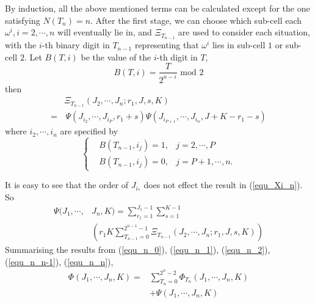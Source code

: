 \documentclass[journal]{IEEEtran}
\begin{document}
By induction, all the above mentioned terms can be calculated except for the one satisfying $N(T_n) = n$. %
After the first stage, we can choose which sub-cell each $\omega^i, i = 2, \cdots, n$ will eventually lie in, and $\Xi_{T_{n-1}}$ are used to consider each situation, with the $i$-th binary digit in $T_{n-1}$ representing that $\omega^i$ lies in sub-cell $1$ or sub-cell $2$. %
Let $B(T, i)$ be the value of the $i$-th digit in $T$,  
\begin{equation}
B(T, i) = \frac{T}{2^{n-i}}\mbox{ mod } 2
\end{equation}
then
\begin{equation}\label{equ_Xi_n}
\begin{aligned}
&\Xi_{T_{n-1}}(J_2, \cdots, J_n; r_1, J, s, K) \\
=&\, \Psi(J_{i_2}, \cdots, J_{i_P}, r_1+s)\Psi(J_{i_{P+1}}, \cdots, J_{i_n}, J+K-r_1-s)
\end{aligned}
\end{equation}
where $i_2, \cdots, i_n$ are specified by
\begin{equation}
\left\{
\begin{aligned}
&B(T_{n-1}, i_j) = 1, &j = 2, \cdots, P\\
&B(T_{n-1}, i_j) = 0, &j = P+1, \cdots, n.
\end{aligned}
\right.
\end{equation}

It is easy to see that the order of $J_{i_*}$ does not effect the result in (\ref{equ_Xi_n}). So
\begin{equation}\label{equ_n_n}
\begin{aligned}
\Psi(J_1, \cdots, &J_n, K) = \sum\limits_{r_1 = 1}^{J_1 - 1} \sum\limits_{s = 1}^{K-1}\\
&\left(r_1K \sum\limits_{T_{n-1} = 0	}^{2^{n-1}-1}\Xi_{T_{n-1}}(J_2, \cdots, J_n; r_1, J, s, K) \right)
\end{aligned}
\end{equation}
Summarising the results from (\ref{equ_n_0}), (\ref{equ_n_1}), (\ref{equ_n_2}), (\ref{equ_n_n-1}), (\ref{equ_n_n}), 
\begin{equation}
\begin{aligned}
\Phi(J_1, \cdots, J_n, K) = &\sum\limits_{T_n = 0}^{2^n-2}\Phi_{T_n}(J_1, \cdots, J_n, K)\\
& + \Psi(J_1, \cdots, J_n, K)
\end{aligned}
\end{equation}
\end{document}
